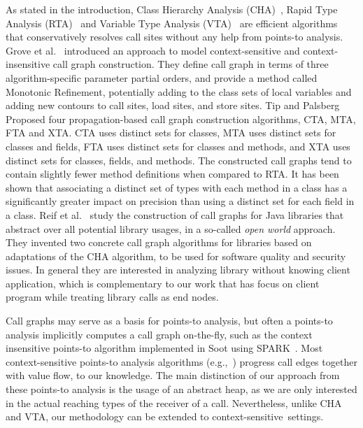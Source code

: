 \documentclass[runningheads]{llncs}
\begin{document}
As stated in the introduction, Class Hierarchy Analysis (CHA)~\cite{Dean1995,Fernandez1995}, Rapid Type Analysis (RTA)~\cite{Bacon1996} and Variable Type Analysis (VTA)~\cite{Sundaresan2000} are efficient algorithms that conservatively resolves call sites without any help from points-to analysis. Grove et al.~\cite{Grove1997} introduced an approach to model context-sensitive and context-insensitive call graph construction. They define call graph in terms of three algorithm-specific parameter partial orders, and provide a method called Monotonic Refinement, potentially adding to the class sets of local variables and adding new contours to call sites, load sites, and store sites.
%
Tip and Palsberg~\cite{Tip2000} Proposed four propagation-based call graph construction algorithms, CTA, MTA, FTA and XTA. CTA uses distinct sets for classes, MTA uses distinct sets for classes and fields, FTA uses distinct sets for classes and methods, and XTA uses distinct
sets for classes, fields, and methods. The constructed call graphs tend to contain slightly fewer method definitions when compared to RTA. It has been shown that associating a distinct set of types with each method in a class has a significantly greater impact on precision than using a distinct set for each field in a class. Reif et al.~\cite{Reif2016} study the construction of call graphs for Java libraries that abstract over all potential library usages, in a so-called \emph{open world} approach. They invented two concrete call graph algorithms for libraries based on adaptations of the CHA algorithm, to be used for software quality and security issues. In general they are interested in analyzing library without knowing client application, which is complementary to our work that has focus on client program while treating library calls as end nodes.

Call graphs may serve as a basis for points-to analysis, but often a points-to analysis implicitly computes a call graph on-the-fly, such as the context insensitive points-to algorithm implemented in Soot using SPARK~\cite{Lhotak2003}. Most context-sensitive points-to analysis algorithms (e.g.,~\cite{Milanova2005,Sridharan2006,Smaragdakis11,Tan16}) progress call edges together with value flow, to our knowledge. The main distinction of our approach from these points-to analysis is the usage of an abstract heap, as we are only interested in the actual reaching types of the receiver of a call. Nevertheless, unlike CHA and VTA, our methodology can be extended to context-sensitive~settings.
\end{document}
